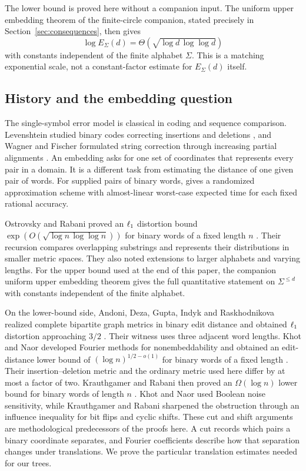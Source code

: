 The lower bound is proved here without a companion input. The uniform
upper embedding theorem of the finite-circle companion, stated precisely
in Section~\ref{sec:consequences}, then gives
\[
 \log E_\Sigma(d)=\Theta\!\left(\sqrt{\log d\,\log\log d}\right)
\]
with constants independent of the finite alphabet $\Sigma$. This is a
matching exponential scale, not a constant-factor estimate for
$E_\Sigma(d)$ itself.

\subsection{History and the embedding question}

The single-symbol error model is classical in coding and sequence
comparison. Levenshtein studied binary codes correcting insertions and
deletions \cite{Levenshtein1966}, and Wagner and Fischer formulated
string correction through increasing partial alignments
\cite[Sections~3 and~5]{WagnerFischer1974}. An embedding asks for one set of
coordinates that represents every pair in a domain. It is a different
task from estimating the distance of one given pair of words.
For supplied pairs of binary words, \cite[Theorem~1.1]{OpenAIEditApprox2026}
gives a randomized approximation scheme with almost-linear worst-case
expected time for each fixed rational accuracy.

Ostrovsky and Rabani proved an $\ell_1$ distortion bound
$\exp(O(\sqrt{\log n\,\log\log n}))$ for binary words of a fixed length
$n$ \cite{OstrovskyRabani2007}. Their recursion compares overlapping
substrings and represents their distributions in smaller metric spaces.
They also noted extensions to larger alphabets and varying lengths.
For the upper bound used at the end of this paper, the companion uniform
upper embedding theorem
\cite[Uniform upper embedding theorem]{OpenAIUniformUpper2026}
gives the full quantitative statement on
$\Sigma^{\leq d}$ with constants independent of the finite alphabet.

On the lower-bound side, Andoni, Deza, Gupta, Indyk and Raskhodnikova
realized complete bipartite graph metrics in binary edit distance and
obtained $\ell_1$ distortion approaching $3/2$
\cite[Section~2 and Theorem~3.1]{AndoniDezaGuptaIndykRaskhodnikova2003}.
Their witness uses three adjacent word lengths.
Khot and Naor developed Fourier methods for
nonembeddability and obtained an edit-distance lower bound of
$(\log n)^{1/2-o(1)}$ for binary words of a fixed length
\cite{KhotNaor2006}. Their insertion--deletion
metric and the ordinary metric used here differ by at most a factor of
two. Krauthgamer and Rabani then proved an $\Omega(\log n)$ lower bound
for binary words of length $n$ \cite[Theorem~1.3]{KrauthgamerRabani2009}.
Khot and Naor used Boolean noise sensitivity, while Krauthgamer and
Rabani sharpened the obstruction through an influence inequality for
bit flips and cyclic shifts. These cut and shift arguments are
methodological predecessors of the proofs here. A cut records which
pairs a binary coordinate separates, and Fourier coefficients describe
how that separation changes under translations. We prove the particular
translation estimates needed for our trees.


